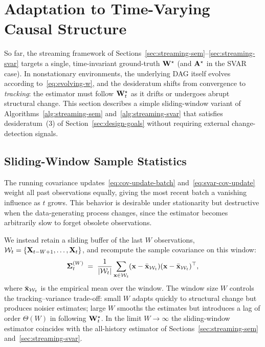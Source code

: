\documentclass[journal,twoside]{IEEEtran}
\begin{document}
\section{Adaptation to Time-Varying Causal Structure}
\label{sec:adaptation}

So far, the streaming framework of
Sections~\ref{sec:streaming-sem}--\ref{sec:streaming-svar} targets a
single, time-invariant ground-truth ${\mathbf W}^\star$ (and ${\mathbf A}^\star$
in the SVAR case). In nonstationary environments, the underlying DAG
itself evolves according to~\eqref{eq:evolving-w}, and the desideratum
shifts from convergence to \emph{tracking}: the estimator must follow
${\mathbf W}^\star_t$ as it drifts or undergoes abrupt structural change.
This section describes a simple sliding-window variant of
Algorithms~\ref{alg:streaming-sem} and~\ref{alg:streaming-svar} that
satisfies desideratum~(3) of Section~\ref{sec:design-goals} without
requiring external change-detection signals.

\subsection{Sliding-Window Sample Statistics}
\label{sec:sliding-window}
The running covariance updates~\eqref{eq:cov-update-batch}
and~\eqref{eq:svar-cov-update} weight all past observations equally,
giving the most recent batch a vanishing influence as $t$ grows. This
behavior is desirable under stationarity but destructive when the
data-generating process changes, since the estimator becomes
arbitrarily slow to forget obsolete observations.

We instead retain a sliding buffer of the last $W$ observations,
$\mathcal{W}_t = \{{\mathbf X}_{t-W+1}, \ldots, {\mathbf X}_t\}$, and recompute
the sample covariance on this window:
\begin{equation}
\label{eq:windowed-cov}
\boldsymbol{\Sigma}_t^{(W)}
\;=\;
\frac{1}{|\mathcal{W}_t|}
\sum_{{\mathbf x} \in \mathcal{W}_t}
({\mathbf x} - \bar{{\mathbf x}}_{\mathcal{W}_t})
({\mathbf x} - \bar{{\mathbf x}}_{\mathcal{W}_t})^\top,
\end{equation}
where $\bar{{\mathbf x}}_{\mathcal{W}_t}$ is the empirical mean over the
window. The window size $W$ controls the tracking--variance trade-off:
small $W$ adapts quickly to structural change but produces noisier
estimates; large $W$ smooths the estimates but introduces a lag of
order $\Theta(W)$ in following ${\mathbf W}^\star_t$. In the limit
$W \to \infty$ the sliding-window estimator coincides with the
all-history estimator of Sections~\ref{sec:streaming-sem}
and~\ref{sec:streaming-svar}.
\end{document}
